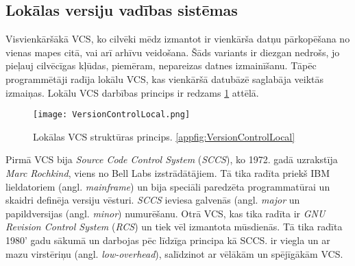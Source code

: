 \subsection{Lokālas versiju vadības sistēmas}
Visvienkāršākā VCS, ko cilvēki mēdz izmantot ir vienkārša datņu pārkopēšana no vienas mapes citā, vai arī arhīvu veidošana. Šāds variants ir diezgan nedrošs, jo pieļauj cilvēcīgas kļūdas, piemēram, nepareizas datnes izmainīšanu. Tāpēc programmētāji radīja lokālu VCS, kas vienkāršā datubāzē saglabāja veiktās izmaiņas. Lokālu VCS darbības princips ir redzams \ref{fig:VersionControlLocal} attēlā.
\begin{figure}[H]%
	\centering
	\captionsetup{justification=centering}
	\texttt{[image: VersionControlLocal.png]}
	\caption{Lokālas VCS struktūras princips. \ref{appfig:VersionControlLocal}}
	\label{fig:VersionControlLocal}
\end{figure}
Pirmā VCS bija \textit{Source Code Control System} (\textit{SCCS}), ko 1972. gadā uzrakstīja \textit{Marc Rochkind}, viens no Bell Labs izstrādātājiem. Tā tika radīta priekš IBM lieldatoriem (angl. \textit{mainframe}) un bija speciāli paredzēta programmatūrai un skaidri definēja versiju vēsturi. \textit{SCCS} ieviesa galvenās (angl. \textit{major} un papildversijas (angl. \textit{minor}) numurēšanu.
Otrā VCS, kas tika radīta ir \textit{GNU Revision Control System} (\textit{RCS}) un tiek vēl izmantota mūsdienās. Tā tika radīta 1980' gadu sākumā un darbojas pēc līdzīga principa kā SCCS.  ir viegla un ar mazu virstēriņu (angl. \textit{low-overhead}), salīdzinot ar vēlākām un spējīgākām VCS. \cite[LVCS]{chacon2014progit}

